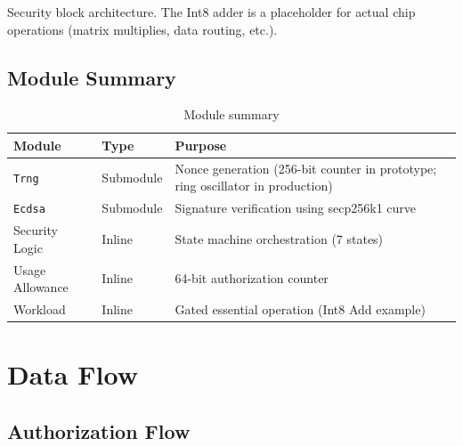 \documentclass[11pt]{article}
\begin{document}
Security block architecture. The Int8 adder is a placeholder for actual chip operations (matrix multiplies, data routing, etc.).

\subsection{Module Summary}

\begin{table}[h]
\centering
\begin{tabular}{@{}llp{6cm}@{}}
\toprule
\textbf{Module} & \textbf{Type} & \textbf{Purpose} \\
\midrule
\texttt{Trng} & Submodule & Nonce generation (256-bit counter in prototype; ring oscillator in production) \\
\midrule
\texttt{Ecdsa} & Submodule & Signature verification using secp256k1 curve \\
\midrule
Security Logic & Inline & State machine orchestration (7 states) \\
\midrule
Usage Allowance & Inline & 64-bit authorization counter \\
\midrule
Workload & Inline & Gated essential operation (Int8 Add example) \\
\bottomrule
\end{tabular}
\caption{Module summary}
\end{table}

\section{Data Flow}

\subsection{Authorization Flow}
\end{document}
